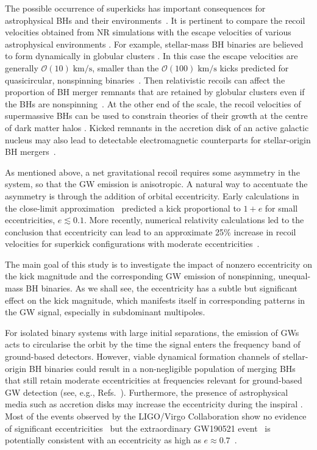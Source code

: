 The possible occurrence of superkicks has important consequences for
astrophysical BHs and their
environments~\cite{Komossa:2012cy,Colpi:2014poa,Blecha:2015baa,Barack:2018yly}.
It is pertinent to compare the recoil velocities obtained from NR
simulations with the escape velocities of various astrophysical
environments \cite{Merritt:2004xa}. For example, stellar-mass BH
binaries are believed to form dynamically in globular clusters
\cite{Benacquista:2011kv}. In this case the escape velocities are
generally $\mathcal{O}(10)\;\mathrm{km/s}$, smaller than the
$\mathcal{O}(100)\;\mathrm{km/s}$ kicks predicted for quasicircular,
nonspinning binaries~\cite{Gonzalez:2006md}. Then relativistic recoils
can affect the proportion of BH merger remnants that are retained by
globular clusters even if the BHs are
nonspinning~\cite{Morawski:2018kfs}. At the other end of the scale,
the recoil velocities of supermassive BHs can be used to constrain
theories of their growth at the centre of dark matter halos
\cite{Haiman:2004ve}. Kicked remnants in the accretion disk of an
active galactic nucleus may also lead to detectable electromagnetic
counterparts for stellar-origin BH
mergers~\cite{Graham:2020gwr,Chen:2020gek}.

As mentioned above, a net gravitational recoil requires some asymmetry in the
system, so that the GW emission is anisotropic.
A natural way to
accentuate the asymmetry is through the addition of orbital
eccentricity. Early calculations in the close-limit
approximation~\cite{Sopuerta:2006et} predicted a kick proportional to
$1+e$ for small eccentricities, $e\lesssim 0.1$.  More recently,
numerical relativity calculations led to the conclusion that
eccentricity can lead to an approximate 25\% increase in recoil
velocities for superkick configurations with moderate
eccentricities~\cite{Sperhake:2019wwo}.

The main goal of this study is to investigate the impact of nonzero
eccentricity on the kick magnitude and the corresponding GW emission
of nonspinning, unequal-mass BH binaries.  As we shall see, the
eccentricity has a subtle but significant effect on the kick
magnitude, which manifests itself in corresponding patterns in the GW
signal, especially in subdominant multipoles.

For isolated binary systems with large initial separations, the
emission of GWs acts to circularise the orbit by the time the signal
enters the frequency band of ground-based detectors.  However, viable
dynamical formation channels of stellar-origin BH binaries could
result in a non-negligible population of merging BHs that still retain
moderate eccentricities at frequencies relevant for ground-based GW
detection (see,
e.g., Refs.~\cite{Samsing:2017rat,Samsing:2017xmd,Samsing:2017oij,Rodriguez:2018pss,Samsing:2020tda,Tagawa:2020jnc}).
Furthermore, the presence of astrophysical media such as
accretion disks may increase the eccentricity during the inspiral
\cite{Cardoso:2020iji}.
Most of the events observed by the LIGO/Virgo Collaboration show no
evidence of significant eccentricities~\cite{Salemi:2019owp} but the
extraordinary GW190521 event~\cite{Abbott:2020tfl} is potentially
consistent with an eccentricity as high as
$e\approx0.7$~\cite{Romero-Shaw:2020thy,Gayathri:2020coq}.

